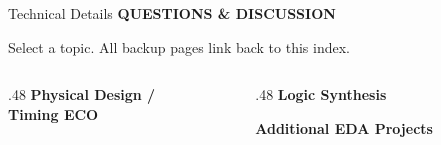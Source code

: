 \documentclass[aspectratio=169,10pt]{beamer}
\newcommand{\smalllabel}[1]{{\scriptsize\bfseries\color{Accent}\MakeUppercase{#1}}}
\newcommand{\slidenavigation}{}
\newcommand{\slideposition}{}
\newcommand{\slidesubtitle}[1]{%
  \smalllabel{#1}%
}
\begin{document}
\appendix
\renewcommand{\slidenavigation}{\hyperlink{summary-4}{\beamerreturnbutton{Back to project overview}}}
\renewcommand{\slideposition}{Details index}
\begin{frame}[label=details-index]{Technical Details}
  \slidesubtitle{Questions \& Discussion}\par\vspace{.18cm}
  {\small Select a topic. All backup pages link back to this index.}\par
  \vspace{.45cm}
  \begin{columns}[T,onlytextwidth]
    \begin{column}{.48\textwidth}
      {\normalsize\bfseries\color{Accent}Physical Design /\\Timing ECO}\par\vspace{.30cm}
      \hyperlink{detail-pd-flow}{}\par\vspace{.30cm}
      \hyperlink{detail-quality}{}\par\vspace{.30cm}
      \hyperlink{detail-parallel}{}
    \end{column}
    \begin{column}{.48\textwidth}
      {\normalsize\bfseries\color{Accent}Logic Synthesis}\par\vspace{.30cm}
      \hyperlink{detail-dc-abc}{}\par\vspace{.30cm}
      \hyperlink{detail-legality}{}\par\vspace{.35cm}
      {\normalsize\bfseries\color{Accent}Additional EDA Projects}\par\vspace{.22cm}
      \hyperlink{detail-mini-soc}{}\par\vspace{.22cm}
      \hyperlink{detail-diffusion-floorplan}{}
    \end{column}
  \end{columns}
\end{frame}
\end{document}
